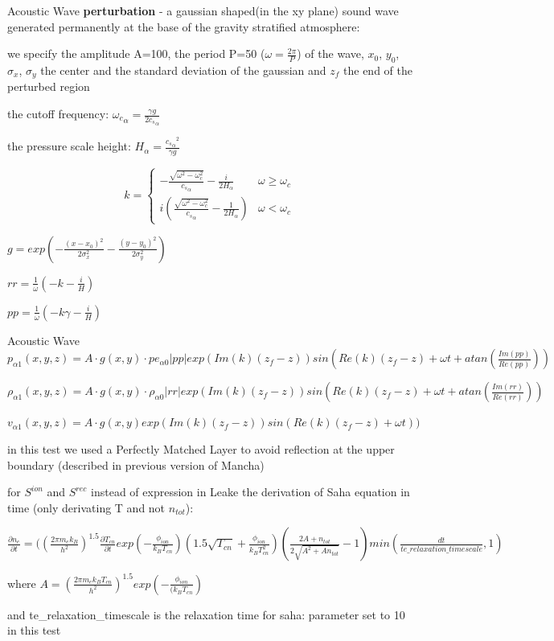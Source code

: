 \documentclass{beamer}
\begin{document}
\begin{frame}{Acoustic Wave}
\textbf{perturbation} - a gaussian shaped(in the xy plane) sound wave generated permanently at the base of the gravity stratified atmosphere:

we specify the amplitude A=100, the period P=50  ($\omega=\frac{2 \pi}{P}$) of the wave, $x_0$, $y_0$, $\sigma_x$, $\sigma_y$ the center and the standard deviation of the gaussian and
 $z_f$ the end of the perturbed region 

the cutoff frequency: ${\omega_c}_\alpha = \frac{\gamma g}{2 {c_s}_\alpha}$

the pressure scale height: $H_\alpha=\frac{{{c_s}_\alpha}^2}{\gamma g}$


\[
k=
 \begin{cases} 
      -\frac{\sqrt{\omega^2 - \omega_c^2}}{{c_s}_\alpha} - \frac{i}{2 H_\alpha}& \omega \ge \omega_c \\
      i(\frac{\sqrt{\omega^2 - \omega_c^2}}{{c_s}_\alpha} - \frac{1}{2 H_\alpha})& \omega < \omega_c 
   \end{cases}
\]

$g = exp(-\frac{(x-x_0)^2}{2 \sigma_x^2} -\frac{(y-y_0)^2}{2 \sigma_y^2} )$

$rr = \frac{1}{\omega}(-k - \frac{i}{H})$

$pp = \frac{1}{\omega}(-k \gamma - \frac{i}{H})$

\end{frame}
\begin{frame}{Acoustic Wave}
$p_{\alpha1}(x,y,z) = A \cdot g(x,y) \cdot {pe_{\alpha0}} |pp| exp(Im(k) (z_f - z)) sin(Re(k) (z_f - z) + \omega t + atan(\frac{Im(pp)}{Re(pp)}))$

$\rho_{\alpha1}(x,y,z) = A \cdot g(x,y) \cdot {\rho_{\alpha0}} |rr| exp(Im(k) (z_f - z)) sin(Re(k) (z_f - z) + \omega t + atan(\frac{Im(rr)}{Re(rr)}))$

$v_{\alpha1}(x,y,z) = A \cdot g(x,y)  exp(Im(k) (z_f - z)) sin(Re(k) (z_f - z) + \omega t))$

in this test we used a Perfectly Matched Layer to avoid reflection at the upper boundary (described in previous version of Mancha) 

for $S^{ion}$ and $S^{rec}$ instead of expression in Leake the derivation of Saha equation in time (only derivating T and not $n_{tot}$):

$\frac{\partial n_e}{\partial t} = 
((\frac{2  \pi  m_e  k_B}{h^2})^{1.5} \frac{\partial T_{cn}}{\partial t} exp(-\frac{\phi_{ion}} {k_B T_{cn}})
      (1.5  \sqrt{T_{cn}}  + \frac{\phi_{ion}}{k_B T_{cn}^2 } ) 
     ( \frac{2 A+ n_{tot}}{2 \sqrt{A^2 + A n_{tot}} } - 1)
       min(\frac{dt}{te\_relaxation\_timescale},1)$

				where $A = (\frac{2  \pi  m_e  k_B  T_{cn}}{h^2})^{1.5}  exp(-\frac{\phi_{ion}} { (k_B  T_{cn}})$

and te\_relaxation\_timescale is the relaxation time for saha: parameter set to 10 in this test


\end{frame}
\end{document}
